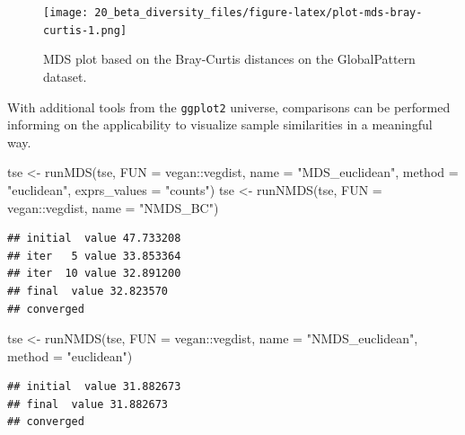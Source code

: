\documentclass[
]{book}
\newenvironment{Shaded}{\begin{snugshade}}{\end{snugshade}}
\newcommand{\AttributeTok}[1]{\textcolor[rgb]{0.77,0.63,0.00}{#1}}
\newcommand{\FunctionTok}[1]{\textcolor[rgb]{0.00,0.00,0.00}{#1}}
\newcommand{\NormalTok}[1]{#1}
\newcommand{\OtherTok}[1]{\textcolor[rgb]{0.56,0.35,0.01}{#1}}
\newcommand{\SpecialCharTok}[1]{\textcolor[rgb]{0.00,0.00,0.00}{#1}}
\newcommand{\StringTok}[1]{\textcolor[rgb]{0.31,0.60,0.02}{#1}}
\begin{document}
\begin{figure}
\centering
\texttt{[image: 20\_beta\_diversity\_files/figure-latex/plot-mds-bray-curtis-1.png]}
\caption{\label{fig:plot-mds-bray-curtis}MDS plot based on the Bray-Curtis distances on the GlobalPattern dataset.}
\end{figure}

With additional tools from the \texttt{ggplot2} universe, comparisons can be
performed informing on the applicability to visualize sample similarities in a
meaningful way.

\begin{Shaded}
\begin{Highlighting}[]
\NormalTok{tse }\OtherTok{\textless{}{-}} \FunctionTok{runMDS}\NormalTok{(tse, }\AttributeTok{FUN =}\NormalTok{ vegan}\SpecialCharTok{::}\NormalTok{vegdist, }\AttributeTok{name =} \StringTok{"MDS\_euclidean"}\NormalTok{,}
             \AttributeTok{method =} \StringTok{"euclidean"}\NormalTok{, }\AttributeTok{exprs\_values =} \StringTok{"counts"}\NormalTok{)}
\NormalTok{tse }\OtherTok{\textless{}{-}} \FunctionTok{runNMDS}\NormalTok{(tse, }\AttributeTok{FUN =}\NormalTok{ vegan}\SpecialCharTok{::}\NormalTok{vegdist, }\AttributeTok{name =} \StringTok{"NMDS\_BC"}\NormalTok{)}
\end{Highlighting}
\end{Shaded}

\begin{verbatim}
## initial  value 47.733208 
## iter   5 value 33.853364
## iter  10 value 32.891200
## final  value 32.823570 
## converged
\end{verbatim}

\begin{Shaded}
\begin{Highlighting}[]
\NormalTok{tse }\OtherTok{\textless{}{-}} \FunctionTok{runNMDS}\NormalTok{(tse, }\AttributeTok{FUN =}\NormalTok{ vegan}\SpecialCharTok{::}\NormalTok{vegdist, }\AttributeTok{name =} \StringTok{"NMDS\_euclidean"}\NormalTok{,}
               \AttributeTok{method =} \StringTok{"euclidean"}\NormalTok{)}
\end{Highlighting}
\end{Shaded}

\begin{verbatim}
## initial  value 31.882673 
## final  value 31.882673 
## converged
\end{verbatim}
\end{document}
